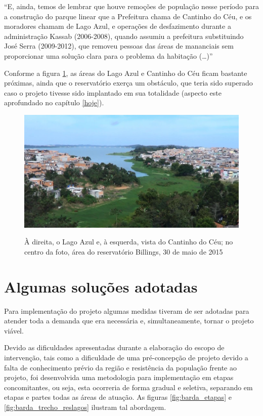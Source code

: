 	\begin{citacao}
		``E, ainda, temos de lembrar que houve remoções de população nesse período para a construção do parque linear que a Prefeitura chama de Cantinho do Céu, e os moradores chamam de Lago Azul, e operações de desfazimento durante a administração Kassab (2006-2008), quando	assumiu a prefeitura substituindo José Serra (2009-2012), que removeu pessoas das áreas de mananciais sem proporcionar uma solução clara para o problema da habitação (\dots)''
	\end{citacao}
	
	Conforme a figura \ref{fig:lago_cantinho}, as áreas do Lago Azul e Cantinho do Céu ficam bastante próximas, ainda que o reservatório exerça um obstáculo, que teria sido superado caso o projeto tivesse sido implantado em sua totalidade (aspecto este aprofundado no capítulo \ref{hoje}).
	
	\begin{figure}[htb]
		\centering
		\caption[Lago Azul e Cantinho do Céu em 30/05/2015]{À direita, o Lago Azul e, à esquerda, vista do Cantinho do Céu; no centro da foto, área do reservatório Billings, 30 de maio de 2015}
		\includegraphics[width=\linewidth]{img/silva_p080_lago_cantinho}
		\label{fig:lago_cantinho}
	\end{figure}
	
	\section{Algumas soluções adotadas} \label{solucoes}

	Para implementação do projeto algumas medidas tiveram de ser adotadas para atender toda a demanda que era necessária e, simultaneamente, tornar o projeto viável.
	
	Devido as dificuldades apresentadas durante a elaboração do escopo de intervenção, tais como a dificuldade de uma pré-concepção de projeto devido a falta de conhecimento prévio da região e resistência da população frente ao projeto, foi desenvolvida uma metodologia para implementação em etapas concomitantes, ou seja, esta ocorreria de forma gradual e seletiva, separando em etapas e partes todas as áreas de atuação. As figuras \ref{fig:barda_etapas} e \ref{fig:barda_trecho_reslagos} ilustram tal abordagem.
	
